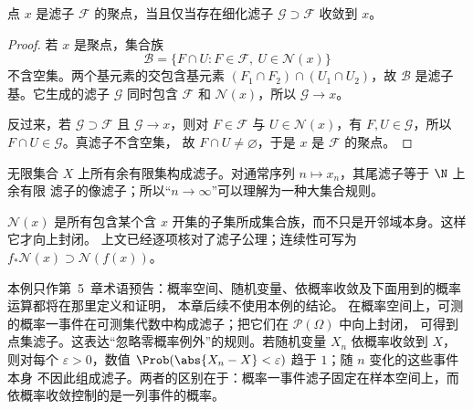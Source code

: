 \begin{proposition}[聚点与细化]\label{proposition:1-1-2-4}
点 \(x\) 是滤子 \(\mathcal F\) 的聚点，当且仅当存在细化滤子
\(\mathcal G\supset\mathcal F\) 收敛到 \(x\)。
\end{proposition}
\begin{proof}
若 \(x\) 是聚点，集合族
\[
 \mathcal B=\{F\cap U:F\in\mathcal F,\ U\in\mathcal N(x)\}
\]
不含空集。两个基元素的交包含基元素
\((F_1\cap F_2)\cap(U_1\cap U_2)\)，故 \(\mathcal B\) 是滤子基。它生成的滤子 \(\mathcal G\)
同时包含 \(\mathcal F\) 和 \(\mathcal N(x)\)，所以 \(\mathcal G\to x\)。

反过来，若 \(\mathcal G\supset\mathcal F\) 且 \(\mathcal G\to x\)，则对 \(F\in\mathcal F\) 与
\(U\in\mathcal N(x)\)，有 \(F,U\in\mathcal G\)，所以 \(F\cap U\in\mathcal G\)。真滤子不含空集，
故 \(F\cap U\ne\varnothing\)，于是 \(x\) 是 \(\mathcal F\) 的聚点。
\end{proof}

\begin{example}[余有限滤子]\label{ex:1-1-2-1}
无限集合 \(X\) 上所有余有限集构成滤子。对通常序列 \(n\mapsto x_n\)，其尾滤子等于 \(\N\) 上余有限
滤子的像滤子；所以“\(n\to\infty\)”可以理解为一种大集合规则。
\end{example}

\begin{example}[邻域滤子]\label{ex:1-1-2-2}
\(\mathcal N(x)\) 是所有包含某个含 \(x\) 开集的子集所成集合族，而不只是开邻域本身。这样它才向上封闭。
上文已经逐项核对了滤子公理；连续性可写为
\(f_*\mathcal N(x)\supset\mathcal N(f(x))\)。
\end{example}

\begin{example}[概率一事件与依概率收敛]\label{ex:1-1-2-3}
本例只作第~5~章术语预告：概率空间、随机变量、依概率收敛及下面用到的概率运算都将在那里定义和证明，
本章后续不使用本例的结论。
在概率空间上，可测的概率一事件在可测集代数中构成滤子；把它们在 \(\mathcal P(\Omega)\) 中向上封闭，
可得到点集滤子。这表达“忽略零概率例外”的规则。若随机变量 \(X_n\) 依概率收敛到 \(X\)，则对每个
\(\varepsilon>0\)，数值 \(\Prob(\abs{X_n-X}<\varepsilon)\) 趋于 \(1\)；随 \(n\) 变化的这些事件本身
不因此组成滤子。两者的区别在于：概率一事件滤子固定在样本空间上，而依概率收敛控制的是一列事件的概率。
\end{example}

